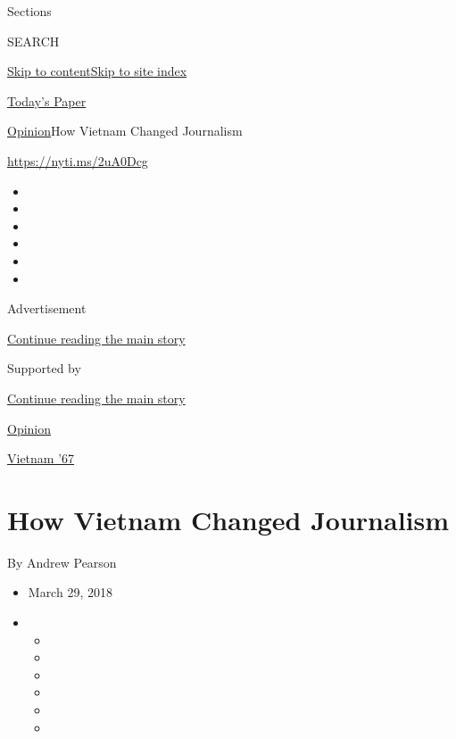 Sections

SEARCH

\protect\hyperlink{site-content}{Skip to
content}\protect\hyperlink{site-index}{Skip to site index}

\href{https://myaccount.nytimes.com/auth/login?response_type=cookie\&client_id=vi}{}

\href{https://www.nytimes.com/section/todayspaper}{Today's Paper}

\href{/section/opinion}{Opinion}\textbar{}How Vietnam Changed Journalism

\href{https://nyti.ms/2uA0Dcg}{https://nyti.ms/2uA0Dcg}

\begin{itemize}
\item
\item
\item
\item
\item
\item
\end{itemize}

Advertisement

\protect\hyperlink{after-top}{Continue reading the main story}

Supported by

\protect\hyperlink{after-sponsor}{Continue reading the main story}

\href{/section/opinion}{Opinion}

\href{/column/vietnam-67}{Vietnam '67}

\hypertarget{how-vietnam-changed-journalism}{%
\section{How Vietnam Changed
Journalism}\label{how-vietnam-changed-journalism}}

By Andrew Pearson

\begin{itemize}
\item
  March 29, 2018
\item
  \begin{itemize}
  \item
  \item
  \item
  \item
  \item
  \item
  \end{itemize}
\end{itemize}

